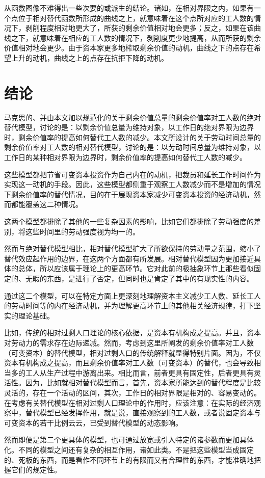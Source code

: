 \documentclass[a4paper,11pt]{ctexart}
\begin{document}
从函数图像不难得出一些次要的或派生的结论。诸如，在相对界限之内，如果有一个点位于相对替代函数所形成的曲线之上，就意味着在这个点所对应的工人数的情况下，剥削程度相对地更大了，所获的剩余价值相对地会更多；反之，如果在该曲线之下，就意味着在相应的工人数的情况下，剥削度更少地提高，从而所获的剩余价值相对地会更少。由于资本家更多地榨取剩余价值的动机，曲线之下的点存在希望上升的动机，曲线之上的点存在抗拒下降的动机。

\section{结论}

马克思的、并由本文加以规范化的关于剩余价值总量的剩余价值率对工人数的绝对替代模型，讨论的是：以剩余价值总量为维持对象，以工作日的绝对界限为边界时，剩余价值率的提高如何替代工人数的减少。本文所设计的关于劳动时间总量的剩余价值率对工人数的相对替代模型，讨论的是：以劳动时间总量为维持对象，以工作日的某种相对界限为边界时，剩余价值率的提高如何替代工人数的减少。

这些模型都把节省可变资本投资作为自己内在的动机，把裁员和延长工作时间作为实现这一动机的手段。因此，这些模型都侧重于观察工人数减少而不是增加的情况下剩余价值率的替代情况，目的在于展现资本家减少可变资本投资的经济动机，然而都能覆盖这二种情况。

这两个模型都排除了其他的一些复杂因素的影响，比如它们都排除了劳动强度的差别，将这些时间里的劳动强度视为均一的。

然而与绝对替代模型相比，相对替代模型扩大了所欲保持的劳动量之范围，缩小了替代效应起作用的边界，在这两个方面都有所发展。相对替代模型因为更加接近具体的总体，所以应该属于理论上的更高环节。它对此前的极抽象环节上那些看似固定的、无暇的东西，是进行了否定，但同时也是肯定了其中的有现实性的内容。

通过这二个模型，可以在特定方面上更深刻地理解资本主义减少工人数、延长工人的劳动时间等的内在经济动机，并为理解更高环节上的其他相关经济规律，打下坚实的理论基础。

比如，传统的相对过剩人口理论的核心依据，是资本有机构成之提高。并且，资本对劳动力的需求存在边际递减。然而，考虑到这里所阐发的剩余价值率对工人数（可变资本）的替代模型，相对过剩人口的传统解释就显得特别片面。因为，不仅资本有机构成之提高，而且剩余价值率对工人数（可变资本）的替代，也会导致相当多的工人从生产过程中游离出来。相比而言，前者更具有固定性，后者更具有灵活性。因为，比如就相对替代模型而言，首先，资本家所能达到的替代程度是比较灵活的，存在一个活动的区间，其次，工作日的相对界限是相对的、容易变动的。在考虑有关替代模型在相对过剩人口理论中的作用时，应该注意：在实际的经济观察中，替代模型已经发挥作用，就是说，直接观察到的工人数，或者说固定资本与可变资本的若干比例云云，已受到替代模型的动态影响。

然而即便是第二个更具体的模型，也可通过放宽或引入特定的诸参数而更加具体化。不同的模型之间还有复杂的相互作用，诸如此类。不是把这些模型当成固定的、死板的东西，而是看作不同环节上的有限而又有合理性的东西，才能准确地把握它们的规定性。
\end{document}
